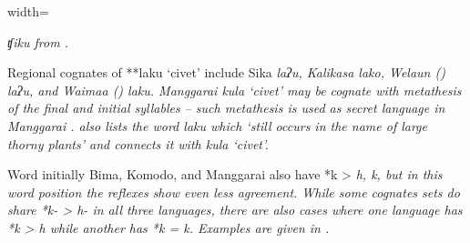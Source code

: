 \begin{table}[p]
\begin{adjustbox}{width=\textwidth}
\begin{threeparttable}
\begin{tablenotes}
{								\it{ʧiku} from \citet[203]{Zollinger1850}.}
			\item[Δ]	{Regional cognates of **laku ‘civet’ include Sika \it{laʔu},
								Kalikasa \it{lako}, Welaun () \it{laʔu},
								and Waima{\Q}a () \it{laku}.
								Manggarai \it{kula} ‘civet’ may be cognate with metathesis of
								the final and initial syllables -- such metathesis is used as secret language in Manggarai \citep[460]{Verheijen1941}.
								\citet[245]{Verheijen1967} also lists the word \it{laku} which
								‘still occurs in the name of large thorny plants’
								and connects it with \it{kula} ‘civet’.}
		\end{tablenotes}
	\end{threeparttable}
\end{adjustbox}
\end{table}

Word initially Bima, Komodo,
and Manggarai also have *k > \it{h,
k,} but in this word position the reflexes show even less agreement.
While some cognates sets do share *k- > \it{h-} in all three
languages, there are also cases where one language has *k > \it{h}
while another has *k = \it{k}.
Examples are given in .

